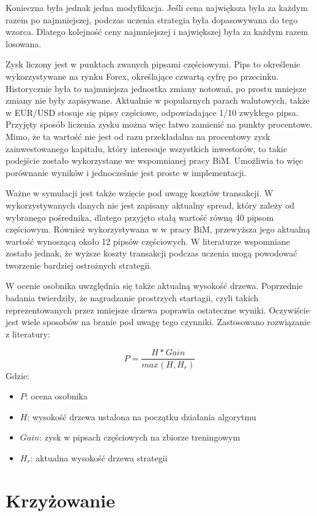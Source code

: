 \documentclass[twoside]{iisthesis}
\begin{document}
Konieczna była jednak jedna modyfikacja. Jeśli cena największa była za każdym razem po najmniejszej, podczas uczenia strategia była dopasowywana do tego wzorca. Dlatego kolejność ceny najmniejszej i największej była za każdym razem losowana.

Zysk liczony jest w punktach zwanych pipsami częściowymi. Pips to określenie wykorzystywane na rynku Forex, określające czwartą cyfrę po przecinku. Historycznie była to najmniejsza jednostka zmiany notowań, po prostu mniejsze zmiany nie były zapisywane. Aktualnie w popularnych parach walutowych, także w EUR/USD stosuje się pipsy częściowe, odpowiadające 1/10 zwykłego pipsa. Przyjęty sposób liczenia zysku można więc łatwo zamienić na punkty procentowe. Mimo, że ta wartość nie jest od razu przekładalna na procentowy zysk zainwestowanego kapitału, który interesuje wszystkich inwestorów, to takie podejście zostało wykorzystane we wspomnianej pracy BiM. Umożliwia to więc porównanie wyników i jednocześnie jest proste w implementacji.

Ważne w symulacji jest także wzięcie pod uwagę kosztów transakcji. W wykorzystywanych danych nie jest zapisany aktualny spread, który zależy od wybranego pośrednika, dlatego przyjęto stałą wartość równą 40 pipsom częściowym. Również wykorzystywana w w pracy BiM, przewyższa jego aktualną wartość wynoszącą około 12 pipsów częściowych. W literaturze wspomniane zostało jednak, że wyższe koszty transakcji podczas uczenia mogą powodować tworzenie bardziej ostrożnych strategii. 

W ocenie osobnika uwzględnia się także aktualną wysokość drzewa. Poprzednie badania twierdziły, że nagradzanie prostrzych startagii, czyli takich reprezentowanych przez mniejsze drzewa poprawia ostateczne wyniki. Oczywiście jest wiele sposobów na branie pod uwagę tego czynniki. Zastosowano rozwiązanie z literatury:

\[P = \frac{H * Gain}{max(H, H_r)}\]
Gdzie:
\begin{itemize}[label=]
	\item $P$: ocena osobnika
	\item $H$: wysokość drzewa ustalona na początku działania algorytmu
	\item $Gain$: zysk w pipsach częściowych na zbiorze treningowym
	\item $H_r$: aktualna wysokość drzewa strategii
\end{itemize}

\section {Krzyżowanie}
\end{document}
